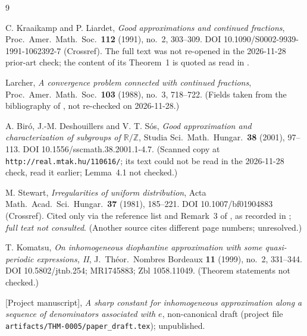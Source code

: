 \documentclass[11pt]{amsart}
\theoremstyle{definition}
\theoremstyle{remark}
\newcommand{\Z}{\mathbb{Z}}
\newcommand{\R}{\mathbb{R}}
\begin{document}
\begin{thebibliography}{9}

 C. Kraaikamp and P. Liardet, \emph{Good approximations and continued fractions},
Proc.\ Amer.\ Math.\ Soc.\ \textbf{112} (1991), no.~2, 303--309.
DOI 10.1090/S0002-9939-1991-1062392-7 (Crossref). The full text was not re-opened in the 2026-11-28
prior-art check; the content of its Theorem~1 is quoted as read in \cite{D5}.

 Larcher, \emph{A convergence problem connected with continued fractions},
Proc.\ Amer.\ Math.\ Soc.\ \textbf{103} (1988), no.~3, 718--722. (Fields taken from the bibliography of
\cite{D5}, not re-checked on 2026-11-28.)

 A. Bir\'o, J.-M. Deshouillers and V. T. S\'os, \emph{Good approximation and characterization of
subgroups of $\R/\Z$}, Studia Sci.\ Math.\ Hungar.\ \textbf{38} (2001), 97--113.
DOI 10.1556/sscmath.38.2001.1-4.7. (Scanned copy at \texttt{http://real.mtak.hu/110616/}; its text could not
be read in the 2026-11-28 check, \cite{D5} read it earlier; Lemma~4.1 not checked.)

 M. Stewart, \emph{Irregularities of uniform distribution},
Acta Math.\ Acad.\ Sci.\ Hungar.\ \textbf{37} (1981), 185--221.
DOI 10.1007/bf01904883 (Crossref). Cited only via the reference list and Remark~3 of \cite{KL}, as recorded in \cite{D5};
\emph{full text not consulted}. (Another source cites different page numbers; unresolved.)

 T. Komatsu, \emph{On inhomogeneous diophantine approximation with some quasi-periodic
expressions, II}, J.\ Th\'eor.\ Nombres Bordeaux \textbf{11} (1999), no.~2, 331--344. DOI 10.5802/jtnb.254;
MR1745883; Zbl 1058.11049. (Theorem statements not checked.)

 [Project manuscript], \emph{A sharp constant for inhomogeneous approximation along a sequence of
denominators associated with $e$}, non-canonical draft (project file \texttt{artifacts/THM-0005/paper\_draft.tex});
unpublished.


\end{thebibliography}
\end{document}
